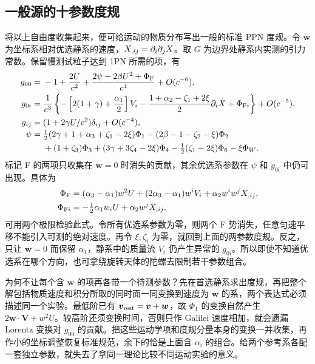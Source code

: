 \subsection{一般源的十参数度规}

将以上自由度收集起来，便可给运动的物质分布写出一般的标准 PPN 度规。令 $\bm w$ 为坐标系相对优选静系的速度，$X_{,ij}=\partial_i\partial_jX$。取 $G$ 为边界处静系内实测的引力常数。保留慢测试粒子达到 1PN 所需的项，有
\begin{align}
 g_{00}={}&-1+\frac{2U}{c^2}
        +\frac{2\psi-2\beta U^2+\Phi_{\rm F}}{c^4}+O(c^{-6}),\nonumber\\
 g_{0i}={}&\frac{1}{c^3}\left\{-\left[2(1+\gamma)+\frac{\alpha_1}{2}\right]V_i
       -\frac{1+\alpha_2-\zeta_1+2\xi}{2}\partial_i\dot X
       +\Phi_{{\rm F}i}\right\}+O(c^{-5}),\nonumber\\
 g_{ij}={}&(1+2\gamma U/c^2)\delta_{ij}+O(c^{-4}),\label{eq:exp-ppn-all}\\[-2pt]
 \psi={}&\tfrac12(2\gamma+1+\alpha_3+\zeta_1-2\xi)\Phi_1
              -(2\beta-1-\zeta_2-\xi)\Phi_2 \nonumber\\
       &+(1+\zeta_3)\Phi_3+(3\gamma+3\zeta_4-2\xi)\Phi_4
              -\tfrac12(\zeta_1-2\xi)\Phi_6-\xi\Phi_W .\nonumber
\end{align}
标记 F 的两项只收集在 $\bm w=0$ 时消失的贡献，其余优选系参数在 $\psi$ 和 $g_{0i}$ 中仍可出现。具体为
\begin{align*}
 \Phi_{\rm F}&=(\alpha_3-\alpha_1)w^2U
           +(2\alpha_3-\alpha_1)w^i V_i+\alpha_2w^iw^jX_{,ij},\\
 \Phi_{{\rm F}i}&=-\tfrac12\alpha_1 w_iU+\alpha_2w^jX_{,ij}.
\end{align*}
可用两个极限检验此式。令所有优选系参数为零，则两个 F 势消失，任意匀速平移不能引入可测的绝对速度。再令 $\xi,\zeta_i$ 为零，就回到上面的两参数度规。反之，只让 $\bm w=0$ 而保留 $\alpha_1$，静系中的质量流 $V_i$ 仍产生异常的 $g_{0i}$。所以即使不知道优选系在哪个方向，也可拿绕旋转天体的陀螺去限制若干参数组合。

为何不让每个含 $\bm w$ 的项再各带一个待测参数？先在首选静系求出度规，再把整个解包括物质速度和积分所取的同时面一同变换到速度为 $\bm w$ 的系，两个表达式必须描述同一个实验。最低阶已有 $\bm v_{\rm rest}=\bm v+\bm w$，故 $\Phi_1$ 的变换自然产生 $2\bm w\cdot\bm V+w^2U$。较高阶还须变换时间，否则只作 Galilei 速度相加，就会遗漏 Lorentz 变换对 $g_{00}$ 的贡献。把这些运动学项和度规分量本身的变换一并收集，再作小的坐标调整恢复标准规范，余下的恰是上面含 $\alpha_i$ 的组合。给两个参考系各配一套独立参数，就失去了拿同一理论比较不同运动实验的意义。

